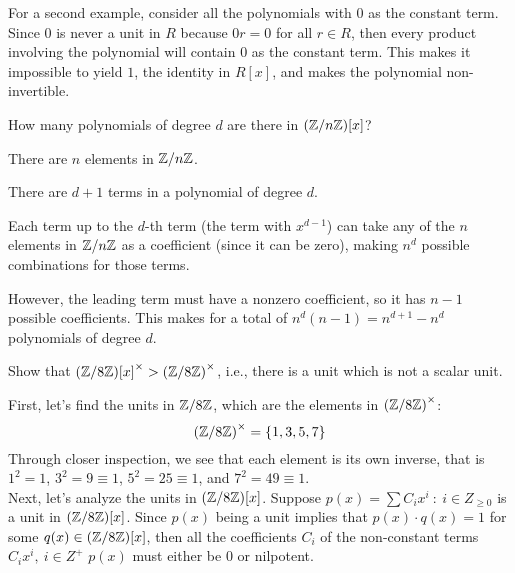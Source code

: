 \begin{problem}
\begin{enumalph}
\begin{Answer}
\begin{enumalph}
        \item For a second example, consider all the polynomials with $0$ as the constant term.
          Since $0$ is never a unit in $R$ because $0r = 0$ for all $r \in R$,
          then every product involving the polynomial will contain $0$ as the constant term.
          This makes it impossible to yield $1$, the identity in $R[x]$,
          and makes the polynomial non-invertible.
        \end{enumalph}
      \end{Answer}
    \item How many polynomials of degree $d$ are there in $(\mathbb{Z}/n\mathbb{Z})[x]$?  
      \begin{Answer}
        \begin{enumalph}
          \item There are $n$ elements in $\mathbb{Z}/n\mathbb{Z}$.
          \item There are $d+1$ terms in a polynomial of degree $d$.
          \item Each term up to the $d$-th term (the term with $x^{d-1}$)
            can take any of the $n$ elements in $\mathbb{Z}/n\mathbb{Z}$ as a coefficient
            (since it can be zero), making $n^{d}$ possible combinations for those terms.
          \item However, the leading term must have a nonzero coefficient,
            so it has $n-1$ possible coefficients. This makes for a total of
            $n^d(n-1) = n^{d+1}-n^{d}$ polynomials of degree $d$.
        \end{enumalph}
      \end{Answer}
    \newpage
    \item Show that ${(\mathbb{Z}/8\mathbb{Z})[x]}^\times > {(\mathbb{Z}/8\mathbb{Z})}^\times$,
      i.e., there is a unit which is not a scalar unit.
      \begin{Answer}
        First, let's find the units in $\mathbb{Z}/8\mathbb{Z}$, which are the elements in ${(\mathbb{Z}/8\mathbb{Z})}^\times$:
        \[ {(\mathbb{Z}/8\mathbb{Z})}^\times = \{1, 3, 5, 7\}\]
        Through closer inspection, we see that each element is its own inverse,
        that is $1^2 = 1$, $3^2 = 9 \equiv 1$, $5^2 = 25 \equiv 1$, and $7^2 = 49 \equiv 1$. \\
        Next, let's analyze the units in $(\mathbb{Z}/8\mathbb{Z})[x]$.
        Suppose $p(x) = \sum C_i{x}^i\ \colon\ i \in Z_{\ge 0}$ is a unit
        in $(\mathbb{Z}/8\mathbb{Z})[x]$.
        Since $p(x)$ being a unit implies that $p(x) \cdot q(x) = 1$ for some
        $q(x) \in (\mathbb{Z}/8\mathbb{Z})[x]$, then all the coefficients $C_i$ of the non-constant
        terms $C_i{x}^i,\ i \in Z^+$ $p(x)$ must either be $0$ or nilpotent.

\end{Answer}
\end{enumalph}
\end{problem}
